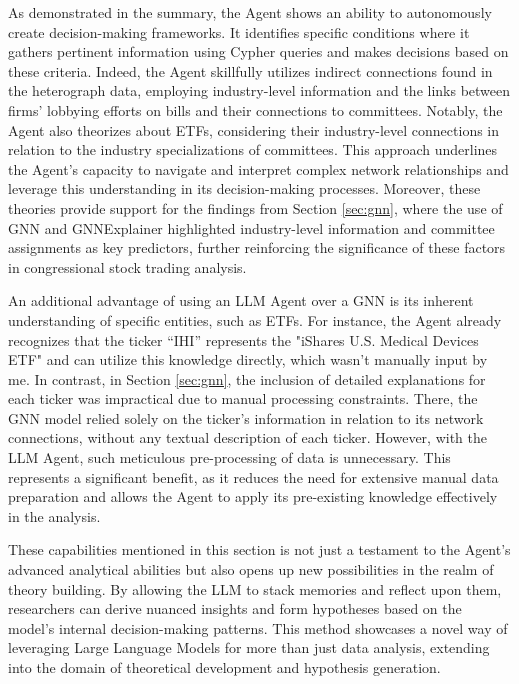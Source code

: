 \documentclass[15pt,letterpaper]{article}
\begin{document}
  As demonstrated in the summary, the Agent shows an ability to autonomously create decision-making frameworks. It identifies specific conditions where it gathers pertinent information using Cypher queries and makes decisions based on these criteria. Indeed, the Agent skillfully utilizes indirect connections found in the heterograph data, employing industry-level information and the links between firms' lobbying efforts on bills and their connections to committees. Notably, the Agent also theorizes about ETFs, considering their industry-level connections in relation to the industry specializations of committees. This approach underlines the Agent's capacity to navigate and interpret complex network relationships and leverage this understanding in its decision-making processes.
  Moreover, these theories provide support for the findings from Section \ref{sec:gnn}, where the use of GNN and GNNExplainer highlighted industry-level information and committee assignments as key predictors, further reinforcing the significance of these factors in congressional stock trading analysis.

  An additional advantage of using an LLM Agent over a GNN is its inherent understanding of specific entities, such as ETFs. For instance, the Agent already recognizes that the ticker ``IHI'' represents the "iShares U.S. Medical Devices ETF" and can utilize this knowledge directly, which wasn't manually input by me. In contrast, in Section \ref{sec:gnn}, the inclusion of detailed explanations for each ticker was impractical due to manual processing constraints. There, the GNN model relied solely on the ticker's information in relation to its network connections, without any textual description of each ticker. However, with the LLM Agent, such meticulous pre-processing of data is unnecessary. This represents a significant benefit, as it reduces the need for extensive manual data preparation and allows the Agent to apply its pre-existing knowledge effectively in the analysis.

  These capabilities mentioned in this section is not just a testament to the Agent's advanced analytical abilities but also opens up new possibilities in the realm of theory building. By allowing the LLM to stack memories and reflect upon them, researchers can derive nuanced insights and form hypotheses based on the model's internal decision-making patterns. This method showcases a novel way of leveraging Large Language Models for more than just data analysis, extending into the domain of theoretical development and hypothesis generation.
  
\end{document}
